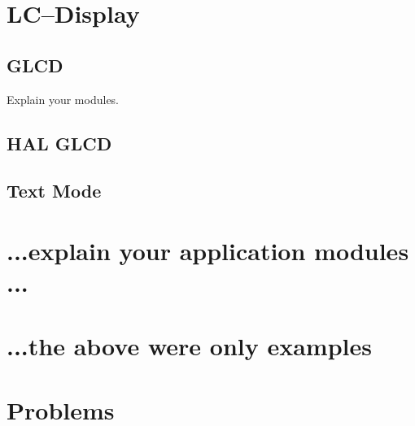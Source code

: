 \documentclass[12pt,a4paper,titlepage,oneside]{article}
\begin{document}
\section{LC--Display}

\subsection{GLCD}

Explain your modules.

\subsection{HAL GLCD}

\subsection{Text Mode}



\section{...explain your application modules ...}

\section{...the above were only examples}



\section{Problems}
\end{document}
